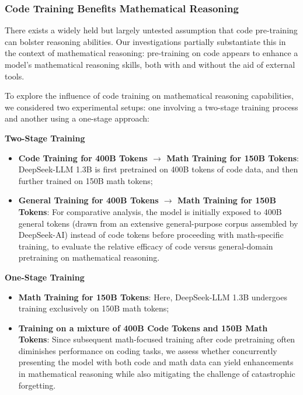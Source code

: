 \begin{itemize}[topsep=0pt]
\subsubsection{Code Training Benefits Mathematical Reasoning}

There exists a widely held but largely untested assumption that code pre-training can bolster reasoning abilities. Our investigations partially substantiate this in the context of mathematical reasoning: pre-training on code appears to enhance a model’s mathematical reasoning skills, both with and without the aid of external tools.

To explore the influence of code training on mathematical reasoning capabilities, we considered two experimental setups: one involving a two-stage training process and another using a one-stage approach:

\textbf{Two-Stage Training}

\begin{itemize}[topsep=0pt]
    \item \textbf{Code Training for 400B Tokens $\rightarrow$ Math Training for 150B Tokens}: DeepSeek-LLM 1.3B is first pretrained on 400B tokens of code data, and then further trained on 150B math tokens;
    \item \textbf{General Training for 400B Tokens $\rightarrow$ Math Training for 150B Tokens}: For comparative analysis, the model is initially exposed to 400B general tokens (drawn from an extensive general-purpose corpus assembled by DeepSeek-AI) instead of code tokens before proceeding with math-specific training, to evaluate the relative efficacy of code versus general-domain pretraining on mathematical reasoning.
\end{itemize}

\textbf{One-Stage Training}

\begin{itemize}[topsep=0pt]
    \item \textbf{Math Training for 150B Tokens}: Here, DeepSeek-LLM 1.3B undergoes training exclusively on 150B math tokens;
    \item \textbf{Training on a mixture of 400B Code Tokens and 150B Math Tokens}: Since subsequent math-focused training after code pretraining often diminishes performance on coding tasks, we assess whether concurrently presenting the model with both code and math data can yield enhancements in mathematical reasoning while also mitigating the challenge of catastrophic forgetting.
\end{itemize}


\end{itemize}

